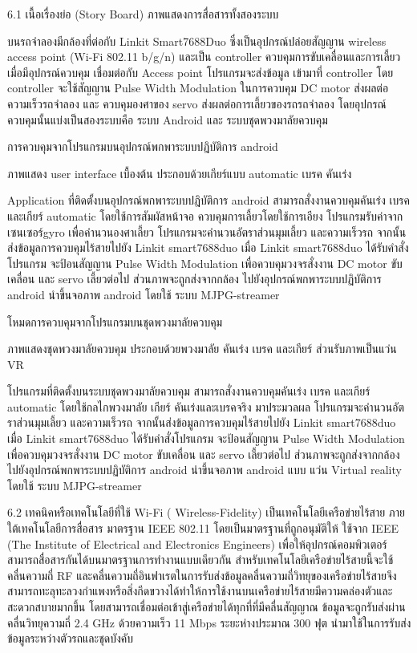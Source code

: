 
6.1 เนื้อเรื่องย่อ (Story Board) 
ภาพแสดงการสื่อสารทั้งสองระบบ

บนรถจำลองมีกล้องที่ต่อกับ Linkit Smart7688Duo ซึ่งเป็นอุปกรณ์ปล่อยสัญญาน wireless access point (Wi-Fi 802.11 b/g/n)  และเป็น controller ควบคุมการขับเคลื่อนและการเลี้ยว 
เมื่อมีอุปกรณ์ควบคุม เชื่อมต่อกับ Access point  โปรแกรมจะส่งข้อมูล เข้ามาที่ controller โดย controller  จะใช้สัญญาน Pulse Width Modulation ในการควบคุม DC motor ส่งผลต่อความเร็วรถจำลอง และ ควบคุมองศาของ servo ส่งผลต่อการเลี้ยวของรถรถจำลอง โดยอุปกรณ์ควบคุมนั้นแบ่งเป็นสองระบบคือ ระบบ Android และ ระบบชุดพวงมาลัยควบคุม 



การควบคุมจากโปรแกรมบนอุปกรณ์พกพาระบบปฎิบัติการ android 


ภาพแสดง user interface เบื้องต้น ประกอบด้วยเกียร์แบบ automatic เบรค คันเร่ง

Application ที่ติดตั้งบนอุปกรณ์พกพาระบบปฎิบัติการ android สามารถสั่งงานควบคุมคันเร่ง เบรค และเกียร์ automatic โดยใช้การสัมผัสหน้าจอ ควบคุมการเลี้ยวโดยใช้การเอียง โปรแกรมรับค่าจากเซนเซอร์gyro เพื่อคำนวนองศาเลี้ยว โปรแกรมจะคำนวนอัตราส่วนมุมเลี้ยว และความเร็วรถ  จากนั้นส่งข้อมูลการควบคุมไร้สายไปยัง Linkit smart7688duo   เมื่อ Linkit smart7688duo ได้รับคำสั่งโปรแกรม จะป้อนสัญญาน Pulse Width Modulation เพื่อควบคุมวงจรสั่งงาน DC motor ขับเคลื่อน และ servo เลี้ยวต่อไป 
ส่วนภาพจะถูกส่งจากกล้อง ไปยังอุปกรณ์พกพาระบบปฏิบัติการ android นำขึ้นจอภาพ android โดยใช้ ระบบ MJPG-streamer


โหมดการควบคุมจากโปรแกรมบนชุดพวงมาลัยควบคุม 

ภาพแสดงชุดพวงมาลัยควบคุม ประกอบด้วยพวงมาลัย คันเร่ง เบรค และเกียร์ ส่วนรับภาพเป็นแว่น VR

โปรแกรมที่ติดตั้งบนระบบชุดพวงมาลัยควบคุม สามารถสั่งงานควบคุมคันเร่ง เบรค และเกียร์ automatic โดยใช้กลไกพวงมาลัย เกียร์ คันเร่งและเบรคจริง มาประมวลผล โปรแกรมจะคำนวนอัตราส่วนมุมเลี้ยว และความเร็วรถ  จากนั้นส่งข้อมูลการควบคุมไร้สายไปยัง Linkit smart7688duo   เมื่อ Linkit smart7688duo ได้รับคำสั่งโปรแกรม จะป้อนสัญญาน Pulse Width Modulation เพื่อควบคุมวงจรสั่งงาน DC motor ขับเคลื่อน และ servo เลี้ยวต่อไป 
ส่วนภาพจะถูกส่งจากกล้อง ไปยังอุปกรณ์พกพาระบบปฏิบัติการ android นำขึ้นจอภาพ android แบบ แว่น Virtual reality โดยใช้ ระบบ MJPG-streamer 


6.2 เทคนิคหรือเทคโนโลยีที่ใช้ 
Wi-Fi  ( Wireless-Fidelity)  เป็นเทคโนโลยีเครือข่ายไร้สาย  ภายใต้เทคโนโลยีการสื่อสาร มาตรฐาน IEEE  802.11  โดยเป็นมาตรฐานที่ถูกอนุมัติให้ ใช้จาก IEEE (The Institute of Electrical and Electronics Engineers) เพื่อให้อุปกรณ์คอมพิวเตอร์สามารถสื่อสารกันได้บนมาตรฐานการทำงานแบบเดียวกัน  สำหรับเทคโนโลยีเครือข่ายไร้สายนี้จะใช้คลื่นความถี่ RF และคลื่นความถี่อินฟาเรตในการรับส่งข้อมูลคลื่นความถี่วิทยุของเครือข่ายไร้สายจึงสามารถทะลุทะลวงกำแพงหรือสิ่งกีดขวางได้ทำให้การใช้งานบนเครือข่ายไร้สายมีความคล่องตัวและสะดวกสบายมากขึ้น โดยสามารถเชื่อมต่อเข้าสู่เครือข่ายได้ทุกที่ที่มีคลื่นสัญญาณ  ข้อมูลจะถูกรับส่งผ่านคลื่นวิทยุความถี่   2.4 GHz  ด้วยความเร็ว  11 Mbps  ระยะห่างประมาณ  300 ฟุต นำมาใช้ในการรับส่งข้อมูลระหว่างตัวรถและชุดบังคับ
 
